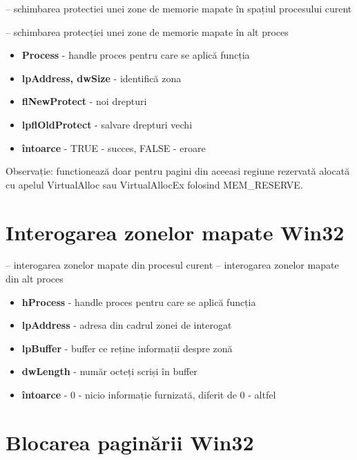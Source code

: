 \documentclass{refcard.cs.pub.ro}
\begin{document}
\begin{multicols*}{3}
 -- schimbarea protectiei unei zone de memorie mapate în spațiul procesului
curent

 -- schimbarea protecției unei zone de memorie mapate în alt proces
\begin{itemize}
\item \textbf{Process} - handle proces pentru care se aplică funcția
\item \textbf{lpAddress, dwSize} - identifică zona
\item \textbf{flNewProtect} - noi drepturi
\item \textbf{lpflOldProtect} - salvare drepturi vechi
\item \textbf{întoarce}  - TRUE - succes, FALSE - eroare
\end{itemize}

Observație: functionează doar pentru pagini din aceeasi regiune rezervată
alocată cu apelul VirtualAlloc sau VirtualAllocEx folosind MEM_RESERVE.

\section{Interogarea zonelor mapate Win32}

 -- interogarea zonelor mapate din procesul curent
 -- interogarea zonelor mapate din alt proces
\begin{itemize}
\item \textbf{hProcess} - handle proces pentru care se aplică funcția
\item \textbf{lpAddress} - adresa din cadrul zonei de interogat
\item \textbf{lpBuffer} - buffer ce reține informații despre zonă
\item \textbf{dwLength} - număr octeți scriși în buffer
\item \textbf{întoarce}  - 0 - nicio informație furnizată, diferit de 0 - altfel
\end{itemize}

\section{Blocarea paginării Win32}


\end{multicols*}
\end{document}

